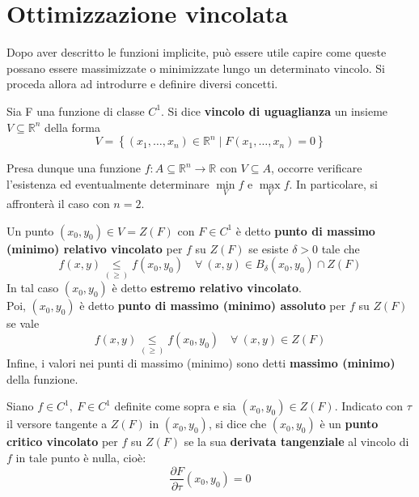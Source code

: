 \section{Ottimizzazione vincolata}
Dopo aver descritto le funzioni implicite, può essere utile capire come queste possano essere massimizzate o minimizzate lungo un determinato vincolo. Si proceda allora ad introdurre e definire diversi concetti.
\begin{definition} \label{Def: Vincolo di uguaglianza}
Sia F una funzione di classe $C^1$. Si dice \textbf{vincolo di uguaglianza} un insieme $V \subseteq \mathbb{R}^n$ della forma
\begin{equation}
    V= \left\{(x_1, \dots, x_n) \in \mathbb{R}^n \mid F(x_1, \dots, x_n)=0 \right\}
\end{equation}
\end{definition}
Presa dunque una funzione $f:A\subseteq \mathbb{R}^n \to \mathbb{R}$ con $V \subseteq A$, occorre verificare l'esistenza ed eventualmente determinare $\min\limits_{V}{f}$ e $\max\limits_{V}{f}$.
In particolare, si affronterà il caso con $n=2$.
\begin{definition} \label{Def: Estremi vincolati}
    Un punto $(x_0, y_0) \in V= Z(F)$ con $F \in C^1$ è detto \textbf{punto di massimo (minimo) relativo vincolato} per $f$ su $Z(F)$ se esiste $\delta>0$ tale che 
    \begin{equation}
        f(x,y) \underset{(\geq)}{\leq} f(x_0, y_0) \quad \forall\ (x, y) \in B_\delta(x_0, y_0) \cap Z(F)
    \end{equation}
    In tal caso $(x_0, y_0)$ è detto \textbf{estremo relativo vincolato}.\\
    Poi, $(x_0, y_0)$ è detto \textbf{punto di massimo (minimo) assoluto} per $f$ su $Z(F)$ se vale
    \begin{equation}
        f(x, y) \underset{(\geq)}{\leq} f(x_0, y_0) \quad \forall\ (x, y) \in Z(F)
    \end{equation}
    Infine, i valori nei punti di massimo (minimo) sono detti \textbf{massimo (minimo)} della funzione.
\end{definition}
\begin{definition} \label{Punto critico vincolato}
    Siano $f \in C^1,\ F \in C^1$ definite come sopra e sia $(x_0, y_0) \in Z(F)$. Indicato con $\tau$ il versore tangente a $Z(F)$ in $(x_0, y_0)$, si dice che $(x_0, y_0)$ è un \textbf{punto critico vincolato} per $f$ su $Z(F)$ se la sua \textbf{derivata tangenziale} al vincolo di $f$ in tale punto è nulla, cioè:
    \begin{equation} \label{Eq: Derivata tangenziale}
        \frac{\partial{F}}{\partial \tau}(x_0, y_0)=0 
    \end{equation}
\end{definition}
